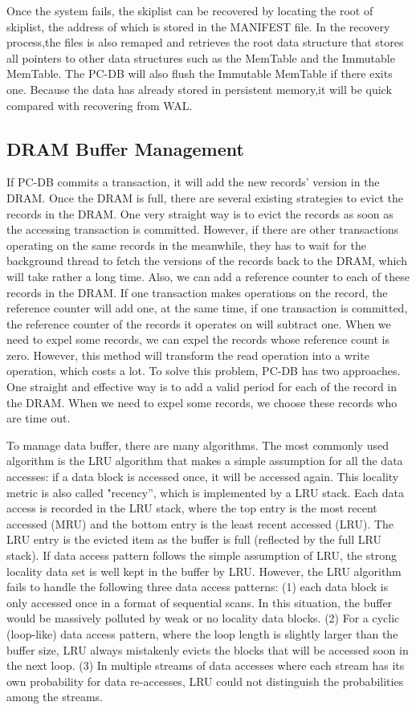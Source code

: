 Once the system fails, 
the skiplist can be recovered  by locating the root of skiplist, 
the address of which is stored in the MANIFEST file. In the recovery process,the files is also remaped and retrieves the root data structure that stores all pointers to other data structures such as the MemTable and the Immutable MemTable. The PC-DB will also flush the Immutable MemTable if there exits one.
Because the data has already stored in persistent memory,it will be quick compared with recovering from WAL.



    
\subsection{DRAM Buffer Management}
If PC-DB commits a transaction, it will add the new records' version in the DRAM. Once the DRAM is full, there are several existing strategies to evict the records in the DRAM. One very straight way is to evict the records as soon as the accessing transaction is committed. 
However, if there are other transactions operating on the same records in the meanwhile, they has to wait for the background thread to fetch the versions of the records back to the DRAM, which will take rather a long time. Also, we can  add a reference counter to each of these records in the DRAM. If one transaction makes operations on the record, the reference counter will add one, at the same time, if one transaction is committed, the reference counter of the records it operates on will subtract one. When we need to expel some records, we can expel the records whose reference count is zero. However, this method will transform the read operation into a write operation, which costs a lot. To solve this problem, PC-DB has two approaches. One straight and effective way is to add a valid period for each of the record in the DRAM. When we need to expel some records, we choose these records who are time out. 

To manage data buffer, there are many algorithms. The most commonly used algorithm is the LRU algorithm that makes a simple assumption for all the data accesses: if a data block is accessed once, it will be accessed again. This locality metric is also called "recency'', which is implemented by a LRU stack. Each data access is recorded in the LRU stack, where the top entry is the most recent accessed (MRU) and the bottom entry is the least recent accessed (LRU). The LRU entry is the evicted item as the buffer is full (reflected by the full LRU stack). If data access pattern follows the simple assumption of LRU, the strong locality data set is well kept in the buffer by LRU. However, the LRU algorithm fails to handle the following three data access patterns: (1) each data block is only accessed once in a format of sequential scans. In this situation, the buffer would be massively polluted by weak or no locality data blocks. (2) For a cyclic (loop-like) data access pattern, where the loop length is slightly larger than the buffer size, LRU always mistakenly evicts the blocks that will be accessed soon in the next loop. (3) In multiple streams of data accesses where each stream has its own probability for data re-accesses, LRU could not distinguish the probabilities among the streams. 

